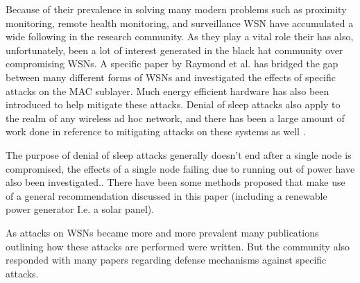 Because of their prevalence in solving many modern problems such as proximity monitoring, remote health monitoring\cite{4561146}, and surveillance WSN have accumulated a wide following in the research community. As they play a vital role their has also, unfortunately, been a lot of interest generated in the black hat community over compromising WSNs. A specific paper by Raymond et al. has bridged the gap between many different forms of WSNs and investigated the effects of specific attacks on the MAC sublayer\cite{4476299}. Much energy efficient hardware has also been introduced to help mitigate these attacks\cite{6558065}. Denial of sleep attacks also apply to the realm of any wireless ad hoc network, and there has been a large amount of work done in reference to mitigating attacks on these systems as well \cite{6112758}.

The purpose of denial of sleep attacks generally doesn't end after a single node is compromised, the effects of a single node failing due to running out of power have also been investigated.\cite{Bradonjic_Hagberg_Feng_2011}. There have been some methods proposed that make use of a general recommendation discussed in this paper (including a renewable power generator I.e. a solar panel)\cite{Harvey_Kyker_2005}.

As attacks on WSNs became more and more prevalent many publications outlining how these attacks are performed were written\cite{1495974}\cite{4431860}. But the community also responded with many papers regarding defense mechanisms against specific attacks\cite{4455251}\cite{5283239}\cite{4267552}\cite{5949172}\cite{6425177}\cite{5541527}\cite{6164340}\cite{6104548}.

